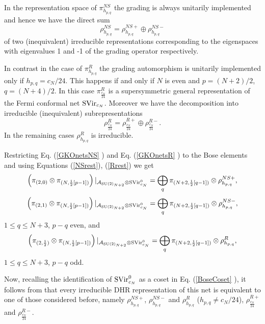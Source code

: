 \documentclass[11pt]{article}
\def\A{{\cal A}}
\def\su2{{{\rm SU}(2)}}
\def\A{{\mathcal A}}
\begin{document}
In the representation space of $\pi_{h_{p,q}}^{NS}$ the grading is always 
unitarily implemented and hence we have the direct sum 
$$\rho_{h_{p,q}}^{NS}= \rho_{h_{p,q}}^{NS+} \oplus\rho_{h_{p,q}}^{NS-}$$ 
of two (inequivalent) irreducible representations corresponding to the 
eigenspaces with eigenvalues 1 and -1 of the grading operator 
respectively. 

In contrast in the case of $\pi_{h_{p,q}}^{R}$ the grading automorphism 
is unitarily implemented only if $h_{p,q}=c_N/24$. This happens  
if and only if $N$ is even and $p=(N+2)/2$, $q=(N+4)/2$. 
In this case $\pi_{\frac{c_N}{24}}^R$ is a supersymmetric 
general representation of the Fermi conformal net ${\rm SVir}_{c_N}$.
Moreover we have the decomposition into irreducible (inequivalent) 
subrepresentations $$\rho_{\frac{c_N}{24}}^R= \rho_{\frac{c_N}{24}}^{R+}\oplus 
\rho_{\frac{c_N}{24}}^{R-}.$$ In the remaining cases 
$\rho_{h_{p,q}}^{R}$ is irreducible. 

Restricting Eq. (\ref{GKOnetsNS} ) and Eq. (\ref{GKOnetsR} ) to the Bose 
elements and using Equations (\ref{NSrest}), (\ref{Rrest})  we get 
%
\begin{equation}
\label{GKOnetsNSb+}
\left( \pi_{(2,0)} \otimes \pi_{(N,\frac{1}{2}[p-1])}\right)
|_{\A_{\su2_{N+2}}\otimes {\rm SVir}^0_{c_N}
} =
\bigoplus_q \pi_{(N+2, \frac{1}{2}[q-1])} \otimes \rho_{h_{p,q}}^{NS+},
\end{equation}
%
\begin{equation}
\label{GKOnetsNSb-}
\left( \pi_{(2,1)} \otimes \pi_{(N,\frac{1}{2}[p-1])}\right)
|_{\A_{\su2_{N+2}}\otimes {\rm SVir}^0_{c_N}} =
\bigoplus_q \pi_{(N+2, \frac{1}{2}[q-1])} \otimes \rho_{h_{p,q}}^{NS-},
\end{equation}
$1\leq q \leq N+3$, $p-q$ even, and 
%                                                                                
\begin{equation}
\label{GKOnetsRb}
\left( \pi_{(2,\frac{1}{2})} \otimes \pi_{(N,\frac{1}{2}[p-1])}\right)
|_{\A_{\su2_{N+2}}\otimes {\rm SVir}^0_{c_N}} =
\bigoplus_q \pi_{(N+2, \frac{1}{2}[q-1])} \otimes \rho_{h_{p,q}}^{R},
\end{equation}
$1\leq q \leq N+3$, $p-q$ odd.     

Now, recalling the identification of ${\rm SVir}^0_{c_N}$ as a 
coset in Eq. (\ref{BoseCoset} ), it 
follows from \cite[Corollary 3.2]{X2} that every irreducible 
DHR representation of this net is equivalent to one of those considered 
before, namely $\rho_{h_{p,q}}^{NS+}$, $\rho_{h_{p,q}}^{NS-}$
and $\rho_{h_{p,q}}^{R}$ ($h_{p,q}\neq c_N/24$), $\rho_{\frac{c_N}{24}}^{R+}$
and $\rho_{\frac{c_N}{24}}^{R-}$.  
%
\end{document}
